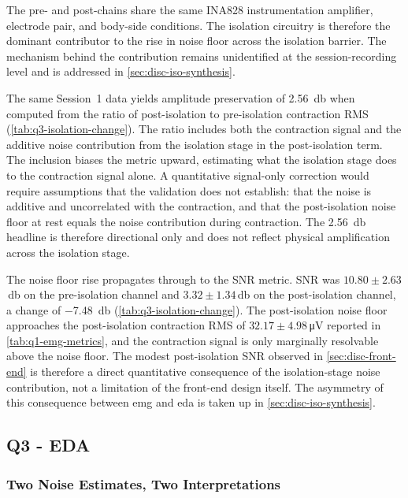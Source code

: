 The pre- and post-chains share the same INA828 instrumentation amplifier, electrode pair, and body-side conditions. The isolation circuitry is therefore the dominant contributor to the rise in noise floor across the isolation barrier. The mechanism behind the contribution remains unidentified at the session-recording level and is addressed in \autoref{sec:disc-iso-synthesis}.

The same Session~1 data yields amplitude preservation of \SI{+2.56}{\decibel} when computed from the ratio of post-isolation to pre-isolation contraction RMS (\autoref{tab:q3-isolation-change}). The ratio includes both the contraction signal and the additive noise contribution from the isolation stage in the post-isolation term. The inclusion biases the metric upward, estimating what the isolation stage does to the contraction signal alone. A quantitative signal-only correction would require assumptions that the validation does not establish: that the noise is additive and uncorrelated with the contraction, and that the post-isolation noise floor at rest equals the noise contribution during contraction. The \SI{+2.56}{\decibel} headline is therefore directional only and does not reflect physical amplification across the isolation stage.

The noise floor rise propagates through to the SNR metric. SNR was $\num{10.80} \pm \num{2.63}$\,\si{\decibel} on the pre-isolation channel and $\num{3.32} \pm \num{1.34}$\,\si{\decibel} on the post-isolation channel, a change of \SI{-7.48}{\decibel} (\autoref{tab:q3-isolation-change}). The post-isolation noise floor approaches the post-isolation contraction RMS of $\num{32.17} \pm \num{4.98}$\,\si{\micro\volt} reported in \autoref{tab:q1-emg-metrics}, and the contraction signal is only marginally resolvable above the noise floor. The modest post-isolation SNR observed in \autoref{sec:disc-front-end} is therefore a direct quantitative consequence of the isolation-stage noise contribution, not a limitation of the front-end design itself. The asymmetry of this consequence between \gls{emg} and \gls{eda} is taken up in \autoref{sec:disc-iso-synthesis}.


\subsection{Q3 - EDA}
\label{sec:disc-iso-eda}

\subsubsection{Two Noise Estimates, Two Interpretations}
\label{sec:disc-iso-eda-noise}

